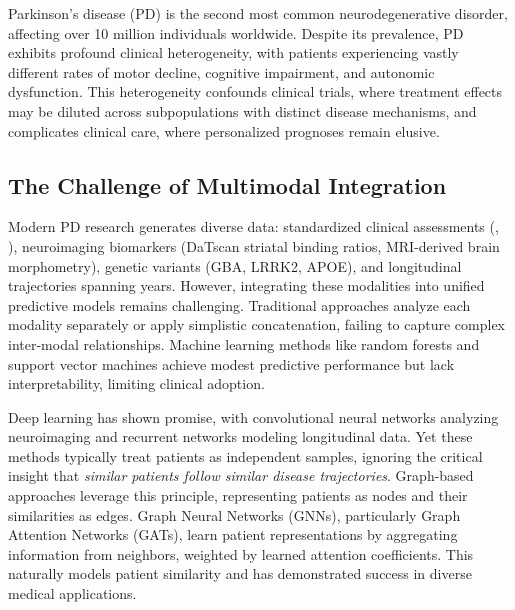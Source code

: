 
Parkinson's disease (PD) is the second most common neurodegenerative disorder, affecting over 10 million individuals worldwide\cite{dorsey2018parkinson}. Despite its prevalence, PD exhibits profound clinical heterogeneity\cite{fereshtehnejad2017clinical}, with patients experiencing vastly different rates of motor decline, cognitive impairment, and autonomic dysfunction\cite{postuma2015mds}. This heterogeneity confounds clinical trials, where treatment effects may be diluted across subpopulations with distinct disease mechanisms\cite{simuni2024clinical}, and complicates clinical care, where personalized prognoses remain elusive\cite{marek2018parkinson}.

\subsection*{The Challenge of Multimodal Integration}

Modern PD research generates diverse data: standardized clinical assessments (\updrs, \moca), neuroimaging biomarkers (DaTscan striatal binding ratios, MRI-derived brain morphometry), genetic variants (GBA, LRRK2, APOE), and longitudinal trajectories spanning years\cite{marek2018parkinson,merchant2020longitudinal}. However, integrating these modalities into unified predictive models remains challenging. Traditional approaches analyze each modality separately\cite{fereshtehnejad2017clinical} or apply simplistic concatenation\cite{zhang2019integrative}, failing to capture complex inter-modal relationships. Machine learning methods like random forests\cite{parisi2019early} and support vector machines\cite{abos2020multimodal} achieve modest predictive performance but lack interpretability, limiting clinical adoption\cite{tjoa2020survey}.

Deep learning has shown promise, with convolutional neural networks analyzing neuroimaging\cite{shen2017deep} and recurrent networks modeling longitudinal data\cite{schulam2015framework}. Yet these methods typically treat patients as independent samples, ignoring the critical insight that \textit{similar patients follow similar disease trajectories}. Graph-based approaches leverage this principle, representing patients as nodes and their similarities as edges\cite{parisot2018disease,kazi2019graph}. Graph Neural Networks (GNNs), particularly Graph Attention Networks (GATs)\cite{velickovic2018graph}, learn patient representations by aggregating information from neighbors, weighted by learned attention coefficients. This naturally models patient similarity and has demonstrated success in diverse medical applications\cite{xie2023survey}.

